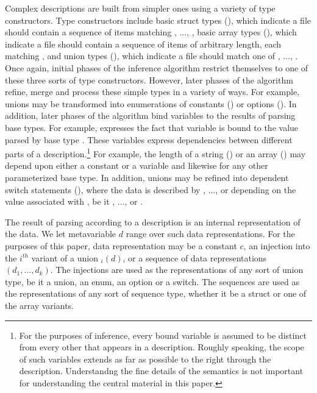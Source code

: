 Complex descriptions are built from simpler ones using a variety of
type constructors.  Type constructors include
basic struct types (), which indicate a file 
should contain a sequence of items matching , ..., ,
basic array types (), which indicate a file should contain
a sequence of items of arbitrary length, each matching ,
and union types (), which indicate a file
should match one of , ..., .  Once again, initial phases
of the inference algorithm restrict themselves to one of these three
sorts of type constructors.  However, later phases of the algorithm
refine, merge and process these simple types in a variety of ways.
For example, unions may be transformed into 
enumerations of constants
() or options ().  In
addition, later phases of the algorithm 
bind variables to the results of parsing 
base types.  For example,  expresses the fact that
variable  is bound to the value parsed by base type
.  These variables express dependencies between 
different parts
of a description.\footnote{For the purposes of inference, 
every bound variable is assumed to be distinct
from every other that appears in a description.  Roughly speaking,
the scope of such variables
extends as far as possible to the right through the description.
Understandng the fine details of the semantics is not important
for understanding the central material in this paper.}  
For example, the length of a string ()
or an array () may depend upon either a constant or
a variable and likewise for any other parameterized base type.  In
addition, unions may be refined into dependent switch statements
(), where the
data is described by , ..., or  depending on the value
associated with , be it , ..., or .

The result of parsing according to a description is an internal
representation of the data. We let metavariable $d$ range over such 
data representations.  For the purposes of this paper, data 
representation may be a constant $c$, an injection into the $i^{th}$
variant of a union $_i(d)$, or a sequence of data representations
$(d_1,\ldots,d_k)$.  The injections are used as the representations of
any sort of union type, be it a union, an enum, an option or a switch.
The sequences are used as the representations of any sort of sequence
type, whether it be a struct or one of the array variants.



